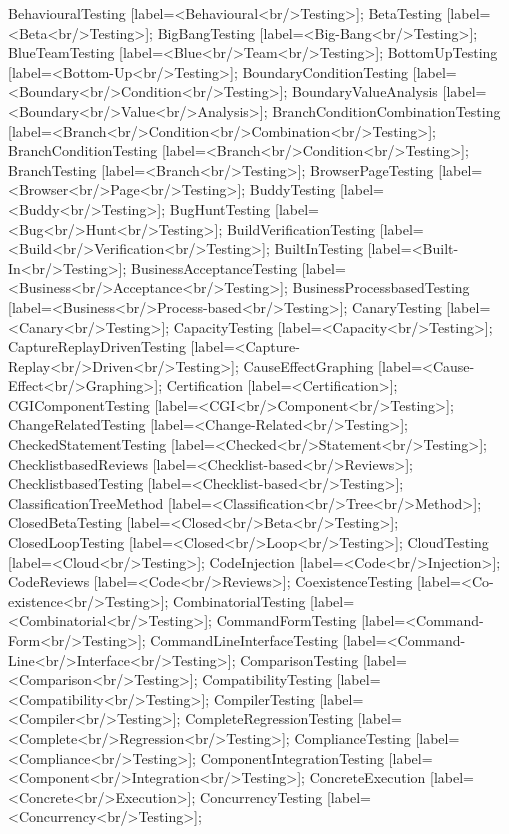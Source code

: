 \documentclass{article}
\begin{document}
{BehaviouralTesting [label=<Behavioural<br/>Testing>];
BetaTesting [label=<Beta<br/>Testing>];
BigBangTesting [label=<Big-Bang<br/>Testing>];
BlueTeamTesting [label=<Blue<br/>Team<br/>Testing>];
BottomUpTesting [label=<Bottom-Up<br/>Testing>];
BoundaryConditionTesting [label=<Boundary<br/>Condition<br/>Testing>];
BoundaryValueAnalysis [label=<Boundary<br/>Value<br/>Analysis>];
BranchConditionCombinationTesting [label=<Branch<br/>Condition<br/>Combination<br/>Testing>];
BranchConditionTesting [label=<Branch<br/>Condition<br/>Testing>];
BranchTesting [label=<Branch<br/>Testing>];
BrowserPageTesting [label=<Browser<br/>Page<br/>Testing>];
BuddyTesting [label=<Buddy<br/>Testing>];
BugHuntTesting [label=<Bug<br/>Hunt<br/>Testing>];
BuildVerificationTesting [label=<Build<br/>Verification<br/>Testing>];
BuiltInTesting [label=<Built-In<br/>Testing>];
BusinessAcceptanceTesting [label=<Business<br/>Acceptance<br/>Testing>];
BusinessProcessbasedTesting [label=<Business<br/>Process-based<br/>Testing>];
CanaryTesting [label=<Canary<br/>Testing>];
CapacityTesting [label=<Capacity<br/>Testing>];
CaptureReplayDrivenTesting [label=<Capture-Replay<br/>Driven<br/>Testing>];
CauseEffectGraphing [label=<Cause-Effect<br/>Graphing>];
Certification [label=<Certification>];
CGIComponentTesting [label=<CGI<br/>Component<br/>Testing>];
ChangeRelatedTesting [label=<Change-Related<br/>Testing>];
CheckedStatementTesting [label=<Checked<br/>Statement<br/>Testing>];
ChecklistbasedReviews [label=<Checklist-based<br/>Reviews>];
ChecklistbasedTesting [label=<Checklist-based<br/>Testing>];
ClassificationTreeMethod [label=<Classification<br/>Tree<br/>Method>];
ClosedBetaTesting [label=<Closed<br/>Beta<br/>Testing>];
ClosedLoopTesting [label=<Closed<br/>Loop<br/>Testing>];
CloudTesting [label=<Cloud<br/>Testing>];
CodeInjection [label=<Code<br/>Injection>];
CodeReviews [label=<Code<br/>Reviews>];
CoexistenceTesting [label=<Co-existence<br/>Testing>];
CombinatorialTesting [label=<Combinatorial<br/>Testing>];
CommandFormTesting [label=<Command-Form<br/>Testing>];
CommandLineInterfaceTesting [label=<Command-Line<br/>Interface<br/>Testing>];
ComparisonTesting [label=<Comparison<br/>Testing>];
CompatibilityTesting [label=<Compatibility<br/>Testing>];
CompilerTesting [label=<Compiler<br/>Testing>];
CompleteRegressionTesting [label=<Complete<br/>Regression<br/>Testing>];
ComplianceTesting [label=<Compliance<br/>Testing>];
ComponentIntegrationTesting [label=<Component<br/>Integration<br/>Testing>];
ConcreteExecution [label=<Concrete<br/>Execution>];
ConcurrencyTesting [label=<Concurrency<br/>Testing>];
}
\end{document}
